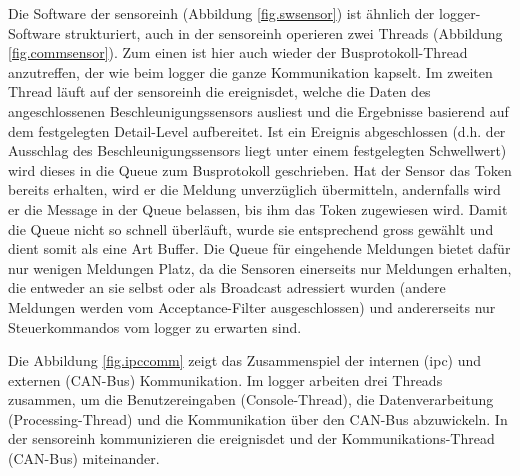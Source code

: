 Die Software der \gls{sensoreinh} (Abbildung \ref{fig.swsensor}) ist ähnlich der \gls{logger}-Software strukturiert, auch in der \gls{sensoreinh} operieren zwei Threads (Abbildung \ref{fig.commsensor}). Zum einen ist hier auch wieder der Busprotokoll-Thread anzutreffen, der wie beim \gls{logger} die ganze Kommunikation kapselt. Im zweiten Thread läuft auf der \gls{sensoreinh} die \gls{ereignisdet}, welche die Daten des angeschlossenen Beschleunigungssensors ausliest und die Ergebnisse basierend auf dem festgelegten Detail-Level aufbereitet. Ist ein Ereignis abgeschlossen (d.h. der Ausschlag des Beschleunigungssensors liegt unter einem festgelegten Schwellwert) wird dieses in die Queue zum Busprotokoll geschrieben. Hat der Sensor das Token bereits erhalten, wird er die Meldung unverzüglich übermitteln, andernfalls wird er die Message in der Queue belassen, bis ihm das Token zugewiesen wird. Damit die Queue nicht so schnell überläuft, wurde sie entsprechend gross gewählt und dient somit als eine Art Buffer. Die Queue für eingehende Meldungen bietet dafür nur wenigen Meldungen Platz, da die Sensoren einerseits nur Meldungen erhalten, die entweder an sie selbst oder als Broadcast adressiert wurden (andere Meldungen werden vom Acceptance-Filter ausgeschlossen) und andererseits nur Steuerkommandos vom \gls{logger} zu erwarten sind.

Die Abbildung \ref{fig.ipccomm} zeigt das Zusammenspiel der internen (\gls{ipc}) und externen (CAN-Bus) Kommunikation. Im \gls{logger} arbeiten drei Threads zusammen, um die Benutzereingaben (Console-Thread), die Datenverarbeitung (Processing-Thread) und die Kommunikation über den CAN-Bus abzuwickeln. In der \gls{sensoreinh} kommunizieren die \gls{ereignisdet} und der Kommunikations-Thread (CAN-Bus) miteinander.

